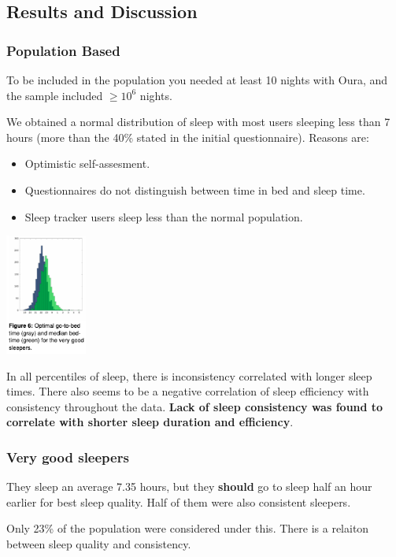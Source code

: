\documentclass{IEEEtran}
\begin{document}
    \subsection{Results and Discussion}
      \subsubsection{Population Based}
        To be included in the population you needed at least 10 nights with Oura, and the sample included $\geq 10^6$ nights. \par 
        We obtained a normal distribution of sleep with most users sleeping less than 7 hours (more than the 40\% stated in the initial questionnaire). Reasons are:
        \begin{itemize}
          \item Optimistic self-assesment.
          \item Questionnaires do not distinguish between time in bed and sleep time.
          \item Sleep tracker users sleep less than the normal population.
        \end{itemize}
        \begin{center}
          \includegraphics[width=0.20\textwidth]{sleepDistribution.png}
        \end{center}
        \par In all percentiles of sleep, there is inconsistency correlated with longer sleep times. There also seems to be a negative correlation of sleep efficiency with consistency throughout the data. \textbf{Lack of sleep consistency was found to correlate with shorter sleep duration and efficiency}.
      \subsubsection{Very good sleepers}
        They sleep an average 7.35 hours, but they \textbf{should} go to sleep half an hour earlier for best sleep quality. Half of them were also consistent sleepers. \par 
        Only 23\% of the population were considered under this. There is a relaiton between sleep quality and consistency.
\end{document}
